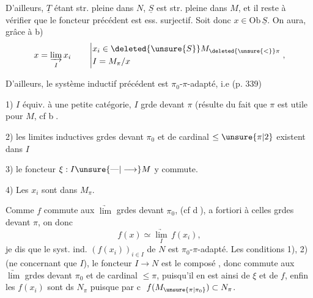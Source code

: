 D'ailleurs, $\underline T$ étant str. pleine dans $N$, $\underline S$ est str. pleine dans $M$, et il reste à vérifier que le foncteur précédent est ess. surjectif. Soit donc $x\in\mathrm{Ob}\,\underline S$. On aura, grâce à b)
\[
x=\underset{I}{\underrightarrow{\lim}}\,x_i
\qquad\left|\begin{aligned}
 &x_i\in\deleted{\unsure{S}}M_{\deleted{\unsure{<}}\pi}\\
 &I=M_\pi/x
\end{aligned}\right. ,
\]

D'ailleurs, le système inductif précédent est $\pi_0$-$\pi$-adapté, i.e (p. 339)

1) $I$ équiv. à une petite catégorie, $I$ grde devant $\pi$ (résulte du fait que $\pi$ est utile pour $M$, cf \textcircled{b}.

2) les limites inductives grdes devant $\pi_0$ et de cardinal $\leq\unsure{\pi|2}$ existent dans $I$ 

3) le foncteur $\xi:I\unsure{\text{---}|\longrightarrow}M$ y commute.

4) Les $x_i$ sont dans $M_\pi$.

Comme $f$ commute aux $\underrightarrow{\lim}$ grdes devant $\pi_0$,  (cf \textcircled{d}), a fortiori à celles grdes devant $\pi$, on  donc
\[
f(x)\simeq\underset I{\underrightarrow{\lim}}\,f(x_i),
\]
je dis que le syst. ind. $(f(x_i))_{i\in I}$ de $N$ est $\pi_0$-$\pi$-adapté. Les conditions 1), 2)  (ne concernant que $I$), le foncteur $I\longrightarrow N$ est le composé
, donc commute aux $\underrightarrow{\lim}$ grdes devant $\pi_0$ et de cardinal $\leq\pi$, puisqu'il en est ainsi de $\xi$ et de $f$, enfin les $f(x_i)$ sont ds $N_\pi$ puisque par \textcircled{c} $f(M_{\unsure{\pi|\pi_0}})\subset N_\pi$.

